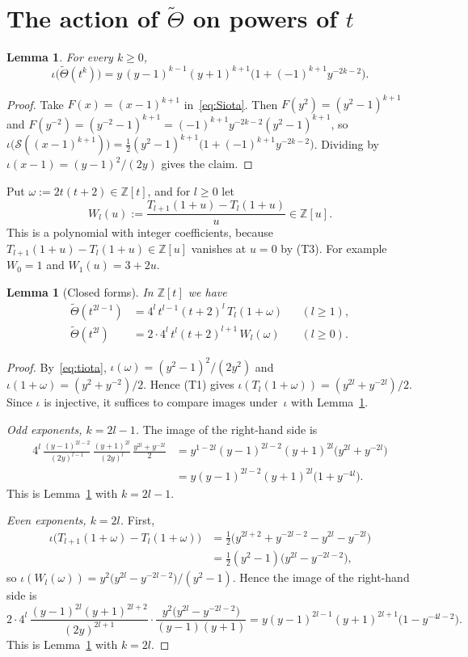 \documentclass[11pt]{amsart}
\newtheorem{lemma}[theorem]{Lemma}
\theoremstyle{definition}
\theoremstyle{remark}
\newcommand{\Z}{\mathbb{Z}}
\newcommand{\Sop}{\mathcal{S}}
\newcommand{\Th}{\widetilde{\Theta}}
\begin{document}
\section{The action of \texorpdfstring{$\Th$}{Theta} on powers of \texorpdfstring{$t$}{t}}\label{sec:closed}

\begin{lemma}\label{lem:yform}
For every $k\ge0$,
\[
  \iota\big(\Th(t^k)\big)=y\,(y-1)^{k-1}(y+1)^{k+1}\big(1+(-1)^{k+1}y^{-2k-2}\big).
\]
\end{lemma}
\begin{proof}
Take $F(x)=(x-1)^{k+1}$ in~\eqref{eq:Siota}. Then $F(y^2)=(y^2-1)^{k+1}$ and $F(y^{-2})=(y^{-2}-1)^{k+1}=(-1)^{k+1}y^{-2k-2}(y^2-1)^{k+1}$, so
$\iota\big(\Sop((x-1)^{k+1})\big)=\tfrac12(y^2-1)^{k+1}\big(1+(-1)^{k+1}y^{-2k-2}\big)$.
Dividing by $\iota(x-1)=(y-1)^2/(2y)$ gives the claim.
\end{proof}

Put $\omega:=2t(t+2)\in\Z[t]$, and for $l\ge0$ let
\[
  W_l(u):=\frac{T_{l+1}(1+u)-T_l(1+u)}{u}\in\Z[u].
\]
This is a polynomial with integer coefficients, because $T_{l+1}(1+u)-T_l(1+u)\in\Z[u]$ vanishes at $u=0$ by (T3). For example $W_0=1$ and $W_1(u)=3+2u$.

\begin{lemma}[Closed forms]\label{lem:closed}
In $\Z[t]$ we have
\begin{align*}
  \Th(t^{2l-1})&=4^l\,t^{l-1}(t+2)^l\,T_l(1+\omega) &&(l\ge1),\\
  \Th(t^{2l})&=2\cdot4^l\,t^{l}(t+2)^{l+1}\,W_l(\omega) &&(l\ge0).
\end{align*}
\end{lemma}
\begin{proof}
By~\eqref{eq:tiota}, $\iota(\omega)=(y^2-1)^2/(2y^2)$ and $\iota(1+\omega)=(y^2+y^{-2})/2$. Hence (T1) gives $\iota(T_l(1+\omega))=(y^{2l}+y^{-2l})/2$. Since $\iota$ is injective, it suffices to compare images under~$\iota$ with Lemma~\ref{lem:yform}.

\emph{Odd exponents, $k=2l-1$.} The image of the right-hand side is
\begin{align*}
  4^l\,\frac{(y-1)^{2l-2}}{(2y)^{l-1}}\,\frac{(y+1)^{2l}}{(2y)^{l}}\,\frac{y^{2l}+y^{-2l}}{2}
  &=y^{1-2l}(y-1)^{2l-2}(y+1)^{2l}\big(y^{2l}+y^{-2l}\big)\\
  &=y(y-1)^{2l-2}(y+1)^{2l}\big(1+y^{-4l}\big).
\end{align*}
This is Lemma~\ref{lem:yform} with $k=2l-1$.

\emph{Even exponents, $k=2l$.} First,
\begin{align*}
  \iota\big(T_{l+1}(1+\omega)-T_l(1+\omega)\big)&=\tfrac12\big(y^{2l+2}+y^{-2l-2}-y^{2l}-y^{-2l}\big)\\
  &=\tfrac12(y^2-1)\big(y^{2l}-y^{-2l-2}\big),
\end{align*}
so $\iota(W_l(\omega))=y^2\big(y^{2l}-y^{-2l-2}\big)/(y^2-1)$. Hence the image of the right-hand side is
\[
  2\cdot4^l\,\frac{(y-1)^{2l}(y+1)^{2l+2}}{(2y)^{2l+1}}\cdot\frac{y^2\big(y^{2l}-y^{-2l-2}\big)}{(y-1)(y+1)}
  =y(y-1)^{2l-1}(y+1)^{2l+1}\big(1-y^{-4l-2}\big).
\]
This is Lemma~\ref{lem:yform} with $k=2l$.
\end{proof}
\end{document}
